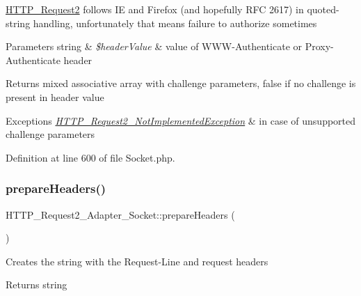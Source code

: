 \hyperlink{classHTTP__Request2}{H\+T\+T\+P\+\_\+\+Request2} follows IE and Firefox (and hopefully R\+FC 2617) in quoted-\/string handling, unfortunately that means failure to authorize sometimes


\begin{DoxyParams}[1]{Parameters}
string & {\em \$header\+Value} & value of W\+W\+W-\/\+Authenticate or Proxy-\/\+Authenticate header\\
\hline
\end{DoxyParams}
\begin{DoxyReturn}{Returns}
mixed associative array with challenge parameters, false if no challenge is present in header value 
\end{DoxyReturn}

\begin{DoxyExceptions}{Exceptions}
{\em \hyperlink{classHTTP__Request2__NotImplementedException}{H\+T\+T\+P\+\_\+\+Request2\+\_\+\+Not\+Implemented\+Exception}} & in case of unsupported challenge parameters \\
\hline
\end{DoxyExceptions}


Definition at line 600 of file Socket.\+php.

\hypertarget{classHTTP__Request2__Adapter__Socket_a8715074a6226005aa4db694a899c759b}{}\label{classHTTP__Request2__Adapter__Socket_a8715074a6226005aa4db694a899c759b} 
\subsubsection{\texorpdfstring{prepare\+Headers()}{prepareHeaders()}}
{\footnotesize\ttfamily H\+T\+T\+P\+\_\+\+Request2\+\_\+\+Adapter\+\_\+\+Socket\+::prepare\+Headers (\begin{DoxyParamCaption}{ }\end{DoxyParamCaption})\hspace{0.3cm}{\ttfamily [protected]}}

Creates the string with the Request-\/\+Line and request headers

\begin{DoxyReturn}{Returns}
string 
\end{DoxyReturn}

